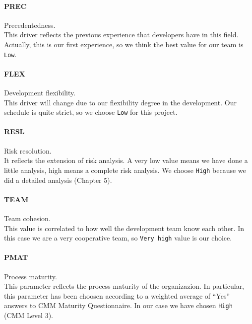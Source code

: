 \paragraph{PREC} Precedentedness. \\  %
This driver reflects the previous experience that developers have in this 
field. Actually, this is our first experience, so we think the best value for
our team is \texttt{Low}.

\paragraph{FLEX} Development flexibility. \\
This driver will change due to our flexibility degree in the development.
Our schedule is quite strict, so we choose \texttt{Low} for this project.

\paragraph{RESL} Risk resolution. \\
It reflects the extension of risk analysis. A very low value means we have done
a little analysis, high means a complete risk analysis. We choose \texttt{High}
because we did a detailed analysis (Chapter 5). 

\paragraph{TEAM} Team cohesion. \\
This value is correlated to how well the development team know each other. 
In this case we are a very cooperative team, so \texttt{Very high} value is
our choice.

\paragraph{PMAT} Process maturity. \\
This parameter reflects the process maturity of the organizazion. In particular,
this parameter has been choosen according to a weighted average of ``Yes'' answers 
to CMM Maturity Questionnaire. In our case we have chosen \texttt{High} (CMM Level 3).


